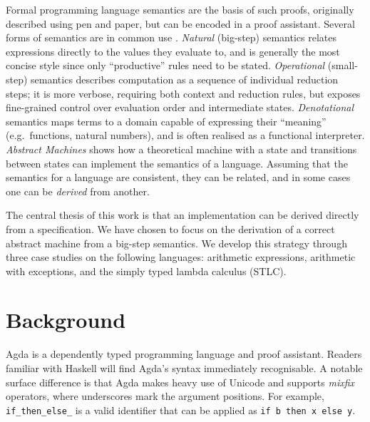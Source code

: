Formal programming language semantics are the basis of such proofs, originally described using pen and paper, but can be encoded in a proof assistant.
Several forms of semantics are in common use \cite{tapl}.
\textit{Natural} (big-step) semantics relates expressions directly to the values they evaluate to, and is generally the most concise style since only ``productive'' rules need to be stated.
\textit{Operational} (small-step) semantics describes computation as a sequence of individual reduction steps; it is more verbose, requiring both context and reduction rules, but exposes fine-grained control over evaluation order and intermediate states.
\textit{Denotational} semantics maps terms to a domain capable of expressing their ``meaning'' (e.g.\ functions, natural numbers), and is often realised as a functional interpreter.
\textit{Abstract Machines} shows how a theoretical machine with a state and transitions between states can implement the semantics of a language.
Assuming that the semantics for a language are consistent, they can be related, and in some cases one can be \textit{derived} from another.

The central thesis of this work is that an implementation can be derived directly from a specification. We have chosen to focus on the derivation of a correct abstract machine from a big-step semantics. 
We develop this strategy through three case studies on the following languages: arithmetic expressions, arithmetic with exceptions, and the simply typed lambda calculus (STLC).

\chapter{Background} %



Agda \cite{vfpinagda} is a dependently typed programming language and proof assistant.
Readers familiar with Haskell will find Agda's syntax immediately recognisable. A notable surface difference is that Agda makes heavy use of Unicode and supports \textit{mixfix} operators, where underscores mark the argument positions.
For example, \texttt{if\_then\_else\_} is a valid identifier that can be applied as \texttt{if b then x else y}.

